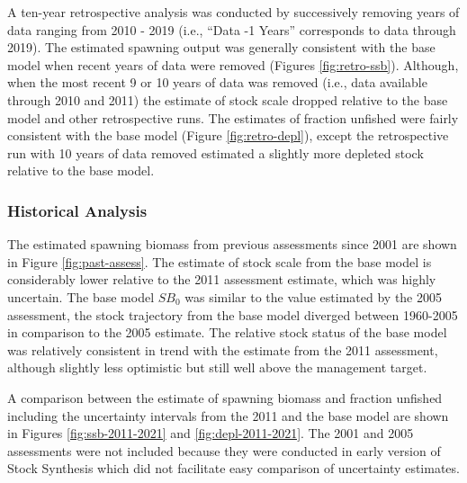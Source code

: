 \documentclass[11pt,
  english,
  a4paper,
]{article}
\begin{document}

A ten-year retrospective analysis was conducted by successively removing years of data ranging from 2010 - 2019 (i.e., ``Data -1 Years'' corresponds to data through 2019). The estimated spawning output was generally consistent with the base model when recent years of data were removed (Figures \ref{fig:retro-ssb}). Although, when the most recent 9 or 10 years of data was removed (i.e., data available through 2010 and 2011) the estimate of stock scale dropped relative to the base model and other retrospective runs. The estimates of fraction unfished were fairly consistent with the base model (Figure \ref{fig:retro-depl}), except the retrospective run with 10 years of data removed estimated a slightly more depleted stock relative to the base model.

\leavevmode\tagmcend\tagstructend\par


\hypertarget{historical-analysis}{%
\subsubsection{Historical Analysis}\label{historical-analysis}}

\leavevmode\tagmcend\tagstructend


The estimated spawning biomass from previous assessments since 2001 are shown in Figure \ref{fig:past-assess}. The estimate of stock scale from the base model is considerably lower relative to the 2011 assessment estimate, which was highly uncertain. The base model {\(SB_0\)\leavevmode\tagmcend\tagstructend} was similar to the value estimated by the 2005 assessment, the stock trajectory from the base model diverged between 1960-2005 in comparison to the 2005 estimate. The relative stock status of the base model was relatively consistent in trend with the estimate from the 2011 assessment, although slightly less optimistic but still well above the management target.

\leavevmode\tagmcend\tagstructend\par


A comparison between the estimate of spawning biomass and fraction unfished including the uncertainty intervals from the 2011 and the base model are shown in Figures \ref{fig:ssb-2011-2021} and \ref{fig:depl-2011-2021}. The 2001 and 2005 assessments were not included because they were conducted in early version of Stock Synthesis which did not facilitate easy comparison of uncertainty estimates.
\end{document}
